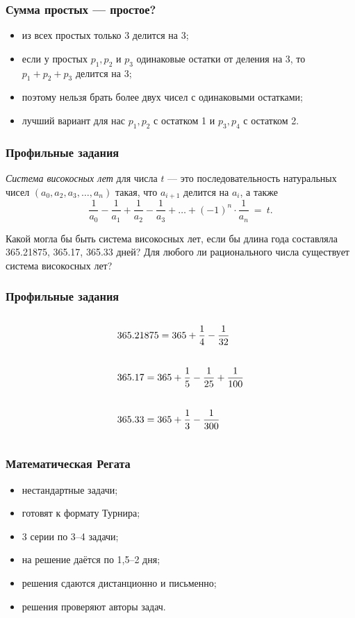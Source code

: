\documentclass[aspectratio=1610,12pt,notheorems]{beamer}
\begin{document}
\begin{frame} \frametitle{Сумма простых — простое?}

\begin{itemize}
	\item из всех простых только 3 делится на 3;
	\item если у простых $p_1, p_2$ и $p_3$ одинаковые остатки от деления на 3, то $p_1+p_2+p_3$ делится на 3;
	\item поэтому нельзя брать более двух чисел с одинаковыми остатками;
	\item лучший вариант для нас $p_1, p_2$ с остатком 1 и $p_3, p_4$ с остатком 2.
\end{itemize}

\end{frame}


\begin{frame} \frametitle{Профильные задания}
{\it Система високосных лет} для числа $t$ — это последовательность натуральных чисел $(a_0, a_2, a_3, \ldots, a_n)$ такая, что $a_{i+1}$ делится на $a_i$, а также
	$$\frac{1}{a_0} - \frac{1}{a_1} + \frac{1}{a_2} - \frac{1}{a_3} + \ldots
	     + (-1)^{n} \cdot \frac{1}{a_n}\ =\ t.$$ \smallskip

Какой могла бы быть система високосных лет, если бы длина года составляла 365.21875, 365.17, 365.33 дней? Для любого ли рационального числа существует система високосных лет?
\end{frame}

\begin{frame} \frametitle{Профильные задания}

\begin{align*}
	& 365.21875 = 365 + \frac{1}{4} - \frac{1}{32}
		\vphantom{\int\limits_{0_0}^{0^0}} \\
	& 365.17 = 365 + \frac{1}{5} - \frac{1}{25} + \frac{1}{100}
		\vphantom{\int\limits_{0_0}^{0^0}} \\
	& 365.33 = 365 + \frac{1}{3} - \frac{1}{300}
		\vphantom{\int\limits_{0_0}^{0^0}} \\
\end{align*}

\end{frame}

\begin{frame} \frametitle{Математическая Регата}
\begin{itemize}
	\item нестандартные задачи;
	\item готовят к формату Турнира;
	\item 3 серии по 3--4 задачи;
	\item на решение даётся по 1,5--2 дня;
	\item решения сдаются дистанционно и письменно;
	\item решения проверяют авторы задач.
\end{itemize}
\end{frame}
\end{document}
